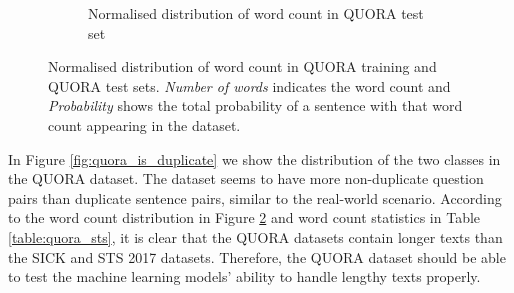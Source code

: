 \begin{enumerate}
\begin{figure}
\begin{subfigure}[b]{.5\textwidth}
		\caption{Normalised distribution of word count in QUORA test set}
		\label{fig:quora_test_words}
	\end{subfigure}
	\caption[Normalised distribution of word count in QUORA training and QUORA test sets.]{Normalised distribution of word count in QUORA training and QUORA test sets. \textit{Number of words} indicates the word count and \textit{Probability} shows the total probability of a sentence with that word count appearing in the dataset.}
	\label{fig:quora_words}
\end{figure}

In Figure \ref{fig:quora_is_duplicate} we show the distribution of the two classes in the QUORA dataset. The dataset seems to have more non-duplicate question pairs than duplicate sentence pairs, similar to the real-world scenario. According to the word count distribution in Figure \ref{fig:quora_words} and word count statistics in Table \ref{table:quora_sts}, it is clear that the QUORA datasets contain longer texts than the SICK and STS 2017 datasets. Therefore, the QUORA dataset should be able to test the machine learning models' ability to handle lengthy texts properly. 


\end{enumerate}
